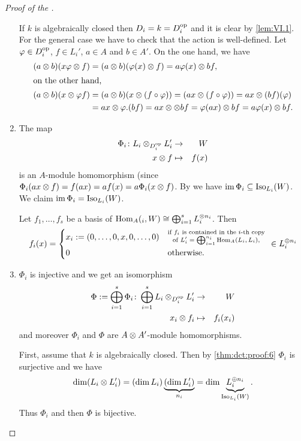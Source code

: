 \documentclass[12pt,a4paper]{scrartcl}
\theoremstyle{cplain}
\theoremstyle{cplain}
\theoremstyle{cplain}
\theoremstyle{definition}
\begin{document}
\begin{otherlanguage}{english}
\begin{proof}[Proof of the ]
\begin{enumerate}[label=\arabic*.]
    If $k$ is algebraically closed then $D_i = k = D_i^{\operatorname{op}}$ and it is clear by \cref{lem:VI.1}. For the general case we have to check that the action is well-defined. Let $\varphi\in D_i^{\operatorname{op}}$, $f\in L_i'$, $a\in A$ and $b\in A'$. On the one hand, we have
    \begin{align*}
      (a\otimes b)(x\varphi \otimes f) &= (a\otimes b) (\varphi(x)\otimes f) = a\varphi(x) \otimes bf, \\
      \intertext{on the other hand, }
      (a\otimes b)(x\otimes \varphi f) &= (a\otimes b)(x\otimes (f\circ\varphi)) = (ax \otimes (f\circ\varphi)) = ax \otimes (bf)(\varphi) \\ &= ax \otimes \varphi . (bf) = ax\otimes \otimes bf = \varphi(ax) \otimes bf = a\varphi(x) \otimes bf.
    \end{align*}
    \item \label{thm:dct:proof:6} The map
    \begin{eqnarray*}
      \Phi_i\colon L_i \otimes_{D_i^{\operatorname{op}}}L_i' &\to& W \\
      x \otimes f &\mapsto& f(x)
    \end{eqnarray*}
    is an $A$-module homomorphism (since $\Phi_i(ax\otimes f) = f(ax) = af(x) = a\Phi_i(x\otimes f)$. By  we have $\operatorname{im} \Phi_i \subseteq \operatorname{Iso}_{L_i}(W)$. We claim $\operatorname{im} \Phi_i = \operatorname{Iso}_{L_i}(W)$.
    
    Let $f_1,\ldots,f_s$ be a basis of $\operatorname{Hom}_A(_i,W) \cong \bigoplus_{i=1}^s L_i^{\otimes n_i}$. Then
    \begin{align*}
      f_i(x) = \begin{cases*} x_i := (0,\ldots,0,x,0,\ldots,0)  & $\substack{\text{if $f_i$ is contained in the $i$-th copy}\\\text{of $L_i' = \bigoplus_{i=1}^{n_i}\Hom_A(L_i,L_i)$,}}$ \\ 0 & otherwise. \end{cases*} \in L_i^{\oplus n_i}
    \end{align*}
    \item \label{thm:dct:proof:7} $\Phi_i$ is injective and we get an isomorphism \begin{eqnarray*} \Phi := \bigoplus_{i=1}^s\Phi_i\colon \bigoplus_{i=1}^sL_i\otimes_{D_i^{\operatorname{op}}}L_i' &\to& W \\ x_i \otimes f_i &\mapsto& f_i(x_i) \end{eqnarray*} and moreover $\Phi_i$ and $\Phi$ are $A\otimes A'$-module homomorphisms.
    
    First, assume that $k$ is algebraically closed. Then by \ref{thm:dct:proof:6} $\Phi_i$ is surjective and we have \[ \dim(L_i \otimes L_i') = (\dim L_i)\underbrace{(\dim L_i')}_{n_i} = \dim \underbrace{L_i^{\oplus n_i}}_{\operatorname{Iso}_{L_i}(W)}. \]
    Thus $\Phi_i$ and then $\Phi$ is bijective.
    

\end{enumerate}
\end{proof}
\end{otherlanguage}
\end{document}

